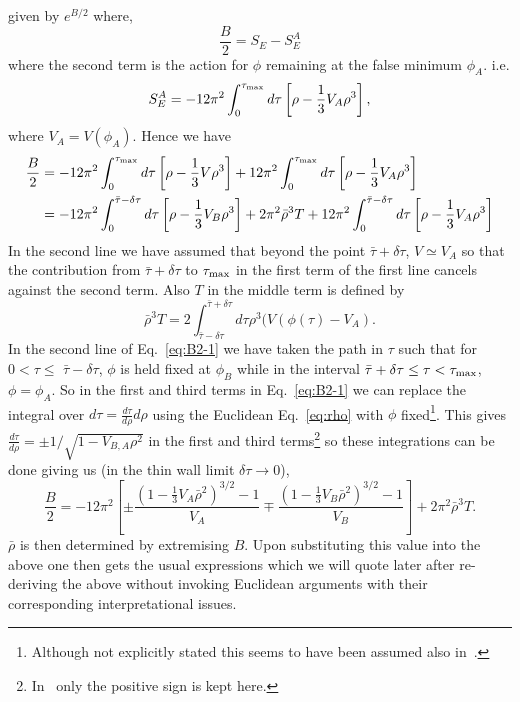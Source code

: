 \documentclass[a4paper,11pt]{article}
\numberwithin{equation}{section}
\newcommand{\citep}{\cite}
\begin{document}
given by $e^{B/2}$ where,
\begin{equation}
\frac{B}{2}=S_{E}-S_{E}^{A}\label{eq:B1-1}
\end{equation}
 where the second term is the action for $\phi$ remaining at the
false minimum $\phi_{A}.$ i.e. 
\[
S_{E}^{A}=-12\pi^{2}\int_{0}^{\tau_{{\rm max}}}d\tau\left[\rho-\frac{1}{3}V_{A}\rho^{3}\right],
\]
where $V_{A}=V(\phi_{A})$. Hence we have 
\begin{align}
\frac{B}{2}& =-12\pi^{2}\int_{0}^{\tau_{{\rm max}}}d\tau\left[\rho-\frac{1}{3}V\rho^{3}\right]+12\pi^{2}\int_{0}^{\tau_{{\rm max}}}d\tau\left[\rho-\frac{1}{3}V_{A}\rho^{3}\right]\nonumber \\
 & =-12\pi^{2}\int_{0}^{\bar{\tau}-\delta\tau}d\tau\left[\rho-\frac{1}{3}V_{B}\rho^{3}\right]+2\pi^{2}\bar{\rho}^{3}T+12\pi^{2}\int_{0}^{\bar{\tau}-\delta\tau}d\tau\left[\rho-\frac{1}{3}V_{A}\rho^{3}\right]\label{eq:B2-1}
\end{align}
In the second line we have assumed that beyond the point $\bar{\tau}+\delta\tau$,
$V\simeq V_{A}$ so that the contribution from $\bar{\tau}+\delta\tau$
to $\text{\ensuremath{\tau_{{\rm max}}}}$ in the first term of the
first line cancels against the second term. Also $T$ in the middle
term is defined by 
\begin{equation}
\bar{\rho}^{3}T=2\int_{\bar{\tau}-\delta\tau}^{\bar{\tau}+\delta\tau}d\tau\rho^{3}(V(\phi(\tau)-V_{A}).\label{eq:T}
\end{equation}
 In the second line of Eq.~\eqref{eq:B2-1} we have taken the path
in $\tau$ such that for $0<\tau\le$ $\bar{\tau}-\delta\tau$, $\phi$
is held fixed at $\phi_{B}$ while in the interval $\bar{\tau}+\delta\tau\le\tau<\tau_{{\rm max}}$,
$\phi=\phi_{A}$. So in the first and third terms in Eq.~\eqref{eq:B2-1}
we can replace the integral over $d\tau=\frac{d\tau}{d\rho}d\rho$
using the Euclidean Eq.~\eqref{eq:rho} with $\phi$ fixed\footnote{Although not explicitly stated this seems to have been assumed also
in~\citep{Parke:1982pm}.}. This gives $\frac{d\tau}{d\rho}=\pm1/\sqrt{1-V_{B,A}\rho^{2}}$
in the first and third terms\footnote{In~\citep{Parke:1982pm} only the positive sign is kept here.}
so these integrations can be done giving us (in the thin wall limit
$\delta \tau\rightarrow0$),
\begin{equation}
\boxed{\quad \frac{B}{2}=-12\pi^{2}\left[\pm\frac{\left(1-\frac{1}{3}V_{A}\bar{\rho}^{2}\right)^{3/2}-1}{V_{A}}\mp\frac{\left(1-\frac{1}{3}V_{B}\bar{\rho}^{2}\right)^{3/2}-1}{V_{B}}\right]+2\pi^{2}\bar{\rho}^{3}T.\quad }\label{eq:B3}
\end{equation}
$\bar{\rho}$ is then determined by extremising $B$. Upon substituting
this value into the above one then gets the usual expressions which
we will quote later after re-deriving the above without invoking
Euclidean arguments with their corresponding interpretational issues.
\end{document}
